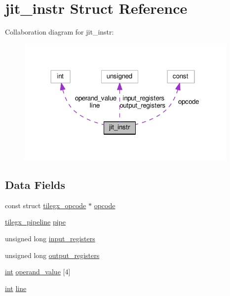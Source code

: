 \hypertarget{structjit__instr}{}\section{jit\+\_\+instr Struct Reference}
\label{structjit__instr}


Collaboration diagram for jit\+\_\+instr\+:
\nopagebreak
\begin{figure}[H]
\begin{center}
\leavevmode
\includegraphics[width=306pt]{structjit__instr__coll__graph}
\end{center}
\end{figure}
\subsection*{Data Fields}
\begin{DoxyCompactItemize}
\item 
const struct \hyperlink{structtilegx__opcode}{tilegx\+\_\+opcode} $\ast$ \hyperlink{structjit__instr_a8047087b3d887939621965b80a95efd4}{opcode}
\item 
\hyperlink{sljitNativeTILEGX-encoder_8c_aa029f8472226bf02a6aac4947f869f6e}{tilegx\+\_\+pipeline} \hyperlink{structjit__instr_abce8df2506dffa494a26ea07249ca1c9}{pipe}
\item 
unsigned long \hyperlink{structjit__instr_a60ebcc2074315cc90961dc05deae1c13}{input\+\_\+registers}
\item 
unsigned long \hyperlink{structjit__instr_a8d5c34fdb22d8fdaf59e003d4563f608}{output\+\_\+registers}
\item 
\hyperlink{pcre_8txt_a42dfa4ff673c82d8efe7144098fbc198}{int} \hyperlink{structjit__instr_a6679f200dfd43f97b98ebcb1d05ccbdf}{operand\+\_\+value} \mbox{[}4\mbox{]}
\item 
\hyperlink{pcre_8txt_a42dfa4ff673c82d8efe7144098fbc198}{int} \hyperlink{structjit__instr_a48ebae1e2eb215baf3d241a1ec45de2d}{line}
\end{DoxyCompactItemize}


